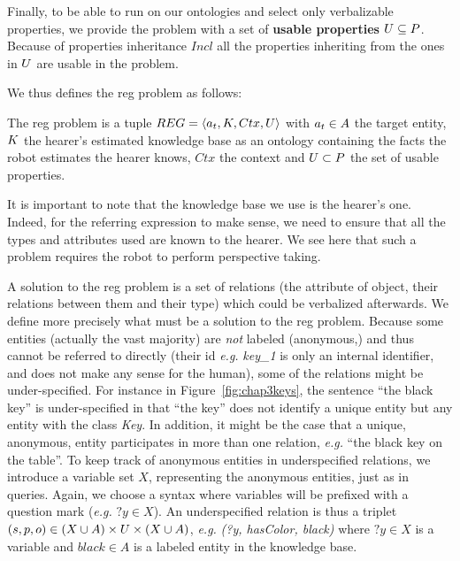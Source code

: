 \documentclass[a4paper,11pt,twoside]{StyleThese}
\begin{document}
\medskip
Finally, to be able to run on our ontologies and select only verbalizable properties, we provide the problem with a set of \textbf{usable properties} $U \subseteq P$. Because of properties inheritance $Incl$ all the properties inheriting from the ones in $U$ are usable in the problem.

We thus defines the \acrshort{reg} problem as follows:
\begin{definition}
The \acrfull{reg} problem is a tuple $REG = \langle a_t, K, Ctx, U \rangle$ with $a_t \in A$ the target entity, $K$ the hearer's estimated knowledge base as an ontology containing the facts the robot estimates the hearer knows, $Ctx$ the context and $U \subset P$ the set of usable properties.
\end{definition}
It is important to note that the knowledge base we use is the hearer's one. Indeed, for the referring expression to make sense, we need to ensure that all the types and attributes used are known to the hearer. We see here that such a problem requires the robot to perform perspective taking.

A solution to the \acrshort{reg} problem is a set of relations (the attribute of object, their relations between them and their type) which could be verbalized afterwards. We define more precisely what must be a solution to the \acrshort{reg} problem.
Because some entities (actually the vast majority) are \textit{not} labeled (anonymous,) and thus cannot be referred to directly (their id \textit{e.g.} \textit{key\_1} is only an internal identifier, and does not make any sense for the human), some of the relations might be under-specified. For instance in Figure~\ref{fig:chap3keys}, the sentence ``the black key'' is under-specified in that ``the key'' does not identify a unique entity but any entity with the class \textit{Key}.
In addition, it might be the case that a unique, anonymous, entity participates in more than one relation, \textit{e.g.} ``the black key on the table''. 
To keep track of anonymous entities in underspecified relations, we introduce a variable set $X$, representing the anonymous entities, just as in \sparql{} queries. Again, we choose a syntax where variables will be prefixed with a question mark (\textit{e.g.} $?y \in X$).
An underspecified relation is thus a triplet $(s, p, o) \in (X \cup A) \times U \times (X \cup A)$, \textit{e.g.} \textit{(?y, hasColor, black)} where $?y \in X$ is a variable and $black \in A$ is a labeled entity in the knowledge base.
\end{document}
